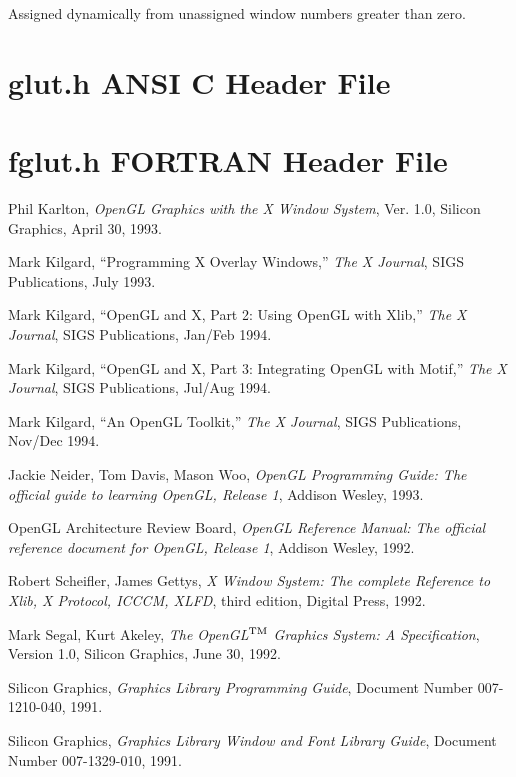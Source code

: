 {\footnotesize
\begin{description}
\itemsep 0in
\item[\takeNote]  Assigned dynamically from unassigned window numbers greater than zero.
\end{description}
}

\section{glut.h ANSI C Header File}

{\footnotesize
{}
}

\section{fglut.h FORTRAN Header File}

{\footnotesize
{}
}

\newpage


\begin{thebibliography}{99}

 Phil Karlton, {\em OpenGL Graphics with the X
Window System}, Ver. 1.0, Silicon Graphics, April 30, 1993.

Mark Kilgard, ``Programming X Overlay Windows,'' {\em The X Journal},
SIGS Publications, July 1993.

Mark Kilgard, ``OpenGL and X, Part 2: Using OpenGL with Xlib,''
{\em The X Journal}, SIGS Publications, Jan/Feb 1994.

Mark Kilgard, ``OpenGL and X, Part 3: Integrating OpenGL with Motif,''
{\em The X Journal}, SIGS Publications, Jul/Aug 1994.

Mark Kilgard, ``An OpenGL Toolkit,''
{\em The X Journal}, SIGS Publications, Nov/Dec 1994.

Jackie Neider, Tom Davis, Mason Woo, {\em OpenGL Programming Guide:
The official guide to learning OpenGL, Release 1}, Addison Wesley, 1993.

OpenGL Architecture Review Board, {\em OpenGL Reference Manual:  The
official reference document for OpenGL, Release 1}, Addison Wesley, 1992.

Robert Scheifler, James Gettys, {\em X Window System: The complete Reference
to Xlib, X Protocol, ICCCM, XLFD}, third edition, Digital Press, 1992.

Mark Segal, Kurt Akeley, {\em The OpenGL${}^{\rm TM}$ Graphics System:
A Specification}, Version 1.0, Silicon Graphics, June 30, 1992.

Silicon Graphics, {\em Graphics Library Programming Guide},
Document Number 007-1210-040, 1991.

Silicon Graphics, {\em Graphics Library Window and Font Library Guide},
Document Number 007-1329-010, 1991.

\end{thebibliography}



